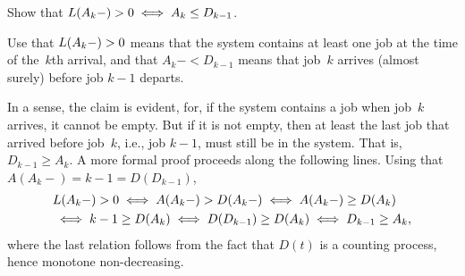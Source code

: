 \documentclass[queueing-book.tex]{subfiles}
\begin{document}






\begin{exercise}
Show  that $L(A_k-)>0 \iff A_k \leq D_{k-1}$.
\begin{hint} Use that $L(A_k-)>0$ means that the system contains at least one job at the time of the~$k$th arrival, and that $A_k- < D_{k-1}$ means that job~$k$ arrives (almost surely) before job $k-1$ departs.
\end{hint}
\begin{solution} In a sense, the claim is evident, for, if the system contains a job when job~$k$ arrives, it cannot be empty.
 But if it is not empty, then at least the last job that arrived before job~$k$, i.e., job $k-1$, must still be in the system.
 That is, $D_{k-1} \geq   A_k$.
 A more formal proof proceeds along the following lines.
 Using that $A(A_k-) = k-1 = D(D_{k-1})$,
 \begin{equation*}
 \begin{split}
& L(A_k-) > 0 \iff A(A_k-) > D(A_k-) \iff A(A_{k}-) \geq D(A_k)  \\
   &\iff k -1 \geq  D(A_k) \iff D(D_{k-1}) \geq  D(A_k) \iff  D_{k-1} \geq A_{k},
 \end{split}
 \end{equation*}
 where the last relation follows from the fact that $D(t)$ is a
 counting process, hence monotone non-decreasing.
\end{solution}
\end{exercise}
\end{document}
